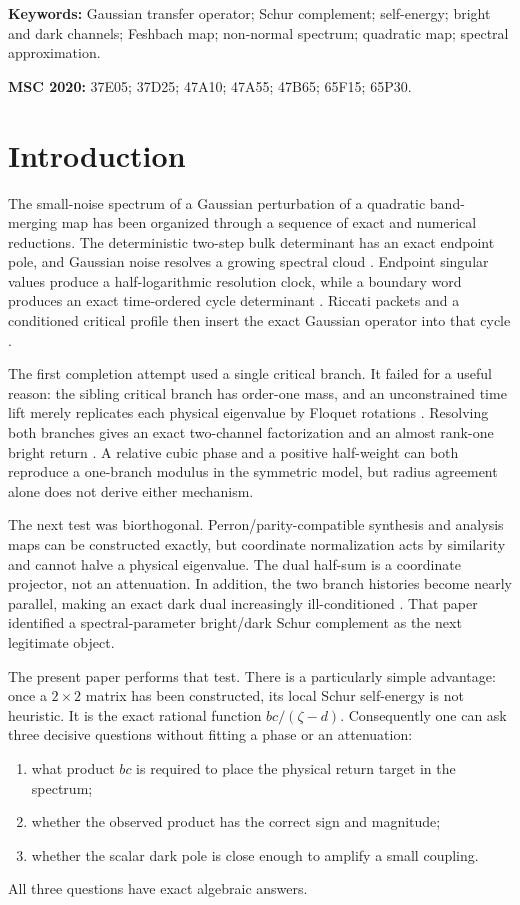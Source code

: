 \documentclass[11pt]{article}
\theoremstyle{definition}
\theoremstyle{remark}
\begin{document}
\noindent\textbf{Keywords:} Gaussian transfer operator; Schur complement;
self-energy; bright and dark channels; Feshbach map; non-normal spectrum;
quadratic map; spectral approximation.

\medskip
\noindent\textbf{MSC 2020:} 37E05; 37D25; 47A10; 47A55; 47B65; 65F15;
65P30.

\section{Introduction}
\label{sec:introduction}

The small-noise spectrum of a Gaussian perturbation of a quadratic
band-merging map has been organized through a sequence of exact and
numerical reductions.  The deterministic two-step bulk determinant has an
exact endpoint pole, and Gaussian noise resolves a growing spectral cloud
\citep{WangBulkScattering2026}.  Endpoint singular values produce a
half-logarithmic resolution clock, while a boundary word produces an exact
time-ordered cycle determinant
\citep{WangEndpointRank2026,WangTimeOrdered2026}.  Riccati packets and a
conditioned critical profile then insert the exact Gaussian operator into
that cycle \citep{WangGaussianReturn2026}.

The first completion attempt used a single critical branch.  It failed for
a useful reason: the sibling critical branch has order-one mass, and an
unconstrained time lift merely replicates each physical eigenvalue by
Floquet rotations \citep{WangComplement2026}.  Resolving both branches gives
an exact two-channel factorization and an almost rank-one bright return
\citep{WangSectorBranch2026}.  A relative cubic phase and a positive
half-weight can both reproduce a one-branch modulus in the symmetric model,
but radius agreement alone does not derive either mechanism.

The next test was biorthogonal.  Perron/parity-compatible synthesis and
analysis maps can be constructed exactly, but coordinate normalization acts
by similarity and cannot halve a physical eigenvalue.  The dual half-sum is
a coordinate projector, not an attenuation.  In addition, the two branch
histories become nearly parallel, making an exact dark dual increasingly
ill-conditioned \citep{WangBiorthogonal2026}.  That paper identified a
spectral-parameter bright/dark Schur complement as the next legitimate
object.

The present paper performs that test.  There is a particularly simple
advantage: once a $2\times2$ matrix has been constructed, its local Schur
self-energy is not heuristic.  It is the exact rational function
$bc/(\zeta-d)$.  Consequently one can ask three decisive questions without
fitting a phase or an attenuation:
\begin{enumerate}[label=(\roman*),leftmargin=2.4em]
 \item what product $bc$ is required to place the physical return target in
 the spectrum;
 \item whether the observed product has the correct sign and magnitude;
 \item whether the scalar dark pole is close enough to amplify a small
 coupling.
\end{enumerate}
All three questions have exact algebraic answers.
\end{document}
